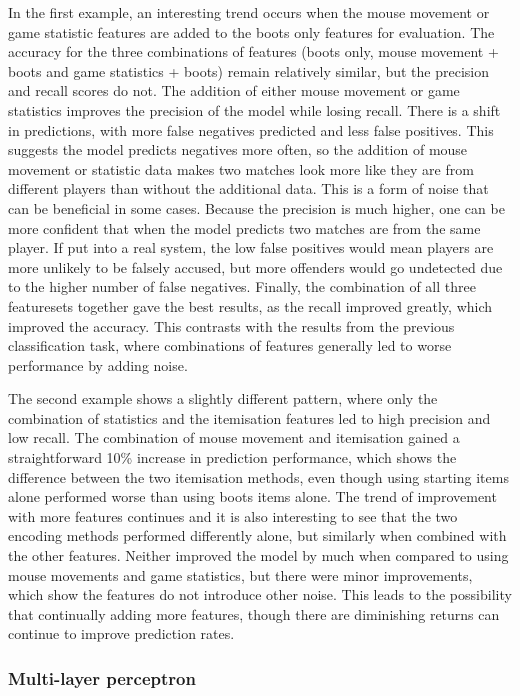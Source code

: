 \documentclass[Report.tex]{subfiles}
\begin{document}
In the first example, an interesting trend occurs when the mouse movement or game statistic features are added to the boots only features for evaluation. The accuracy for the three combinations of features (boots only, mouse movement + boots and game statistics + boots) remain relatively similar, but the precision and recall scores do not. The addition of either mouse movement or game statistics improves the precision of the model while losing recall. There is a shift in predictions, with more false negatives predicted and less false positives. This suggests the model predicts negatives more often, so the addition of mouse movement or statistic data makes two matches look more like they are from different players than without the additional data. This is a form of noise that can be beneficial in some cases. Because the precision is much higher, one can be more confident that when the model predicts two matches are from the same player. If put into a real system, the low false positives would mean players are more unlikely to be falsely accused, but more offenders would go undetected due to the higher number of false negatives. Finally, the combination of all three featuresets together gave the best results, as the recall improved greatly, which improved the accuracy. This contrasts with the results from the previous classification task, where combinations of features generally led to worse performance by adding noise. 

The second example shows a slightly different pattern, where only the combination of statistics and the itemisation features led to high precision and low recall. The combination of mouse movement and itemisation gained a straightforward 10\% increase in prediction performance, which shows the difference between the two itemisation methods, even though using starting items alone performed worse than using boots items alone. The trend of improvement with more features continues and it is also interesting to see that the two encoding methods performed differently alone, but similarly when combined with the other features. Neither improved the model by much when compared to using mouse movements and game statistics, but there were minor improvements, which show the features do not introduce other noise. This leads to the possibility that continually adding more features, though there are diminishing returns can continue to improve prediction rates. 

\subsubsection{Multi-layer perceptron}
\end{document}
